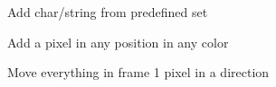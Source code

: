 \documentclass[11pt]{article} %
\begin{document}
\begin{figure}[H]
	\centering
	\caption{Add char/string from predefined set}
	\label{fig:UC4}
\end{figure}

\begin{figure}[H]
	\centering
	\caption{Add a pixel in any position in any color}
	\label{fig:UC5}
\end{figure}

\begin{figure}[H]
	\centering
	\caption{Move everything in frame 1 pixel in a direction}
	\label{fig:UC6}
\end{figure}
\end{document}
